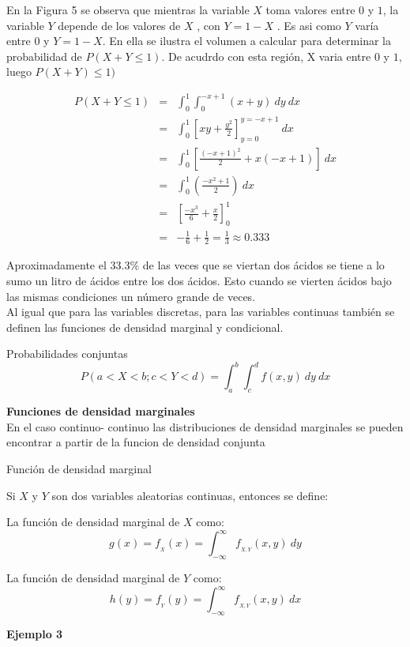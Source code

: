 \documentclass[base=hide,12pt]{elegantbook}
\begin{document}
\begin{itemize}
%	
	En la Figura 5 se observa que mientras la variable $X$ toma valores entre $0$ y $1$, la variable $Y$ depende de los valores de $X$ , con $Y=1-X$ . Es asi como $Y$ varía entre $0$ y $Y=1-X$. En ella se ilustra el volumen a calcular para determinar la  probabilidad de $P(X+Y \leq 1)$. De acudrdo con esta región, X varia entre $0$ y $1$,  luego $P(X+Y)\leq 1)$
	
	\begin{eqnarray*}
		P(X+Y\leq 1)&=&\int_{0}^{1}\int_{0}^{-x+1}(x+y)\:dy\:dx\\
		&=&\int_{0}^{1}\left[xy+\frac{y^2}{2}\right]_{y=0}^{y=-x+1}\:dx\\
		&=&\int_{0}^{1}\left[\frac{(-x+1)^2}{2}+x(-x+1)\right]\:dx\\
		&=&\int_{0}^{1}\left(\frac{-x^2+1}{2}\right)\:dx\\
		&=&\left[\frac{-x^3}{6}+\frac{x}{2}\right]_{0}^{1}\\
		&=&-\frac{1}{6}+\frac{1}{2}=\frac{1}{3}\approx 0.333
	\end{eqnarray*}
\end{itemize}
Aproximadamente el $33.3\%$ de las veces que se viertan dos ácidos se tiene a lo sumo un litro de ácidos entre los dos ácidos. Esto cuando se vierten ácidos bajo las mismas condiciones un número grande de veces. \\
%				
Al igual que para las variables discretas,  para las  variables continuas también se definen las funciones de densidad marginal y condicional.\\

\begin{Box4}{Probabilidades conjuntas}
$$P(a<X<b ; c<Y<d) = \int_{a}^{b} \int_{c}^{d} f(x,y) \:dy \:dx$$
\end{Box4}
\vspace{1cm}

\textcolor{col4}{\bf \large Funciones de densidad marginales}\\

En el caso continuo- continuo las distribuciones de densidad marginales se pueden encontrar a partir de la funcion de densidad conjunta 
\begin{Box4}{Función de densidad marginal}

Si $X$ y $Y$ son dos variables aleatorias continuas, entonces se define:\newline

La función de densidad marginal de $X$ como:
$$g(x)=f_{_{X}}(x)=\int_{-\infty}^{\infty}f_{_{X,Y}}(x,y)\:dy$$

\vspace{.3cm}
La función de densidad marginal de $Y$ como:
$$h(y)=f_{_{Y}}(y)=\int_{-\infty}^{\infty}f_{_{X,Y}}(x,y)\:dx$$



\end{Box4}
%
\textcolor{col3}{\bf \large Ejemplo 3}
\end{document}

